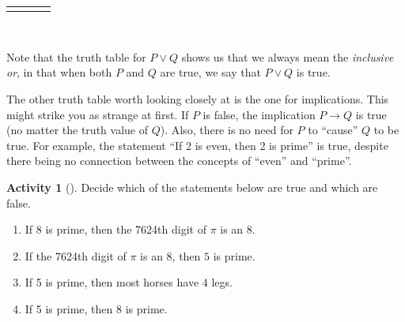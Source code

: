 \documentclass[10pt,]{book}
\theoremstyle{plain}
\theoremstyle{definition}
\theoremstyle{definition}
\theoremstyle{definition}
\newtheorem{activity}[project]{Activity}
\numberwithin{equation}{chapter}
\newlength{\panelmax}
\def\imp{\rightarrow}
\begin{document}
{{{{\begin{tabular}{cBc}
\end{tabular}
}}}
\ifdefined\phDtabular\else\newlength{\phDtabular}\fi%
\setlength{\phDtabular}{\ht\panelboxDtabular+\dp\panelboxDtabular}
\settototalheight{\phDtabular}{\usebox{\panelboxDtabular}}
\setlength{\panelmax}{\maxof{\panelmax}{\phDtabular}}
\leavevmode%
\setlength{\tabcolsep}{0.025\linewidth}
\par\medskip\noindent
\hspace*{0.025\linewidth}%
\begin{tabular}{@{}*{4}{c}@{}}
\begin{minipage}[c][\panelmax][t]{0.2\linewidth}\usebox{\panelboxAtabular}\end{minipage}&
\begin{minipage}[c][\panelmax][t]{0.2\linewidth}\usebox{\panelboxBtabular}\end{minipage}&
\begin{minipage}[c][\panelmax][t]{0.2\linewidth}\usebox{\panelboxCtabular}\end{minipage}&
\begin{minipage}[c][\panelmax][t]{0.2\linewidth}\usebox{\panelboxDtabular}\end{minipage}\end{tabular}\\
}%
\par
\hypertarget{p-159}{}%
Note that the truth table for \(P \vee Q\) shows us that we always mean the \emph{inclusive or}, in that when both \(P\) and \(Q\) are true, we say that \(P \vee Q\) is true.%
\par
\hypertarget{p-160}{}%
The other truth table worth looking closely at is the one for implications.  This might strike you as strange at first.  If \(P\) is false, the implication \(P \imp Q\) is true (no matter the truth value of \(Q\)).  Also, there is no need for \(P\) to ``cause'' \(Q\) to be true.  For example, the statement ``If 2 is even, then 2 is prime'' is true, despite there being no connection between the concepts of ``even'' and ``prime''.%
\begin{activity}[]\label{activity-7}
\hypertarget{p-161}{}%
Decide which of the statements below are true and which are false.%
\begin{enumerate}[font=\bfseries,label=(\alph*),ref=\alph*]
\item\label{task-9} \hypertarget{p-162}{}%
If 8 is prime, then the 7624th digit of \(\pi\) is an 8.%
\item\label{task-10} \hypertarget{p-163}{}%
If the 7624th digit of \(\pi\) is an 8, then \(5\) is prime.%
\item\label{task-11} \hypertarget{p-164}{}%
If 5 is prime, then most horses have 4 legs.%
\item\label{task-12} \hypertarget{p-165}{}%
If 5 is prime, then 8 is prime.%
\end{enumerate}
\end{activity}
\end{document}
